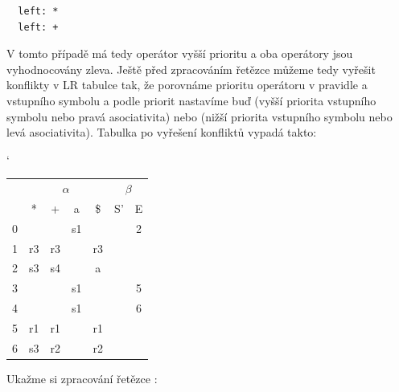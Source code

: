 \begin{exmp}
\begin{lstlisting}
  left: *
  left: +
\end{lstlisting}

V tomto případě má tedy operátor  \symb{*} vyšší prioritu a oba operátory jsou vyhodnocovány zleva.
Ještě před zpracováním řetězce můžeme tedy vyřešit konflikty v LR tabulce tak,
že porovnáme prioritu operátoru v  pravidle a vstupního symbolu
a podle priorit nastavíme buď  (vyšší priorita vstupního symbolu nebo pravá asociativita)
nebo  (nižší priorita vstupního symbolu nebo levá asociativita).
Tabulka po vyřešení konfliktů vypadá takto:

\begin{table}[H]
  \catcode`
  \centering
  \begin{tabular}{| c || c | c | c | c || c | c |}
    \hline
    \multirow{2}{*}{} & \multicolumn{4}{c||}{$\alpha$}& \multicolumn{2}{c|}{$\beta$} \\
    \cline{2-7}
      & * & + & a & \$& S'& E \\
    \hhline{|=||=|=|=|=||=|=|}
    0 &   &   & s1 &   &   & 2 \\
    \hline
    1 & r3 & r3 &   & r3 &   &   \\
    \hline
    2 & s3 & s4 &   & a &   &   \\
    \hline
    3 &   &   & s1 &   &   & 5 \\
    \hline
    4 &   &   & s1 &   &   & 6 \\
    \hline
    5 & r1 &  r1 & & r1 &   & \\
    \hline
    6 & s3 &  r2 & & r2 &   & \\
    \hline
  \end{tabular}
\end{table}

Ukažme si zpracování řetězce :
\begin{figure}[H]
  \centering
\end{figure}


\end{exmp}
